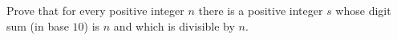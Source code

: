 Prove that for every positive integer $n$ there is a positive integer $s$ whose digit sum (in base $10$) is $n$ and which is divisible by $n$.
